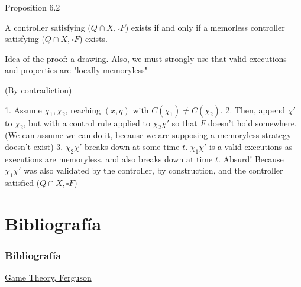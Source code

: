 \begin{frame}
	Proposition 6.2 %
	
	A controller satisfying	 ($Q \cap X, \square F$) exists if and only if a memorless controller satisfying ($Q \cap X, \square F$) exists.

Idea of the proof: a drawing. Also, we must strongly use that valid executions and properties are "locally memoryless"

(By contradiction)

1. Assume $\chi_1,\chi_2$, reaching $(x,q)$ with $C(\chi_1) \neq C(\chi_2)$.
2. Then, append $\chi'$ to $\chi_2$, but with a control rule applied to $\chi_2 \chi'$ so that $F$ doesn't hold somewhere. (We can assume we can do it, because we are supposing a memoryless strategy doesn't exist)
3. $\chi_2 \chi'$ breaks down at some time $t$. $\chi_1 \chi'$ is a valid executions as executions are memoryless, and also breaks down at time $t$. Absurd! Because $\chi_1 \chi'$ was also validated by the controller, by construction, and the controller satisfied ($Q \cap X, \square F$)

\end{frame}




\section{Bibliografía}

\begin{frame}
\frametitle{Bibliografía}

\href{<http://www.math.ucla.edu/~tom/Game_Theory/comb.pdf>}{Game Theory, Ferguson}

\end{frame}


